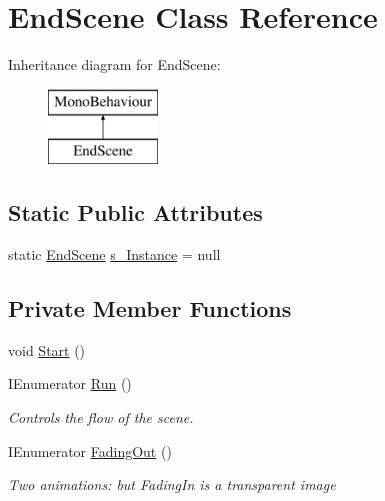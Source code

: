 \hypertarget{class_end_scene}{}\section{End\+Scene Class Reference}
\label{class_end_scene}
Inheritance diagram for End\+Scene\+:\begin{figure}[H]
\begin{center}
\leavevmode
\includegraphics[height=2.000000cm]{class_end_scene}
\end{center}
\end{figure}
\subsection*{Static Public Attributes}
\begin{DoxyCompactItemize}
\item 
static \mbox{\hyperlink{class_end_scene}{End\+Scene}} \mbox{\hyperlink{class_end_scene_a6cf08b038600652991ae00a9cf2a949b}{s\+\_\+\+Instance}} = null
\end{DoxyCompactItemize}
\subsection*{Private Member Functions}
\begin{DoxyCompactItemize}
\item 
void \mbox{\hyperlink{class_end_scene_af546101a56df683a50f88f6809d4638a}{Start}} ()
\item 
I\+Enumerator \mbox{\hyperlink{class_end_scene_aad3f8f074f1937a0615f21e95b74f33c}{Run}} ()
\begin{DoxyCompactList}\small\item\em Controls the flow of the scene. \end{DoxyCompactList}\item 
I\+Enumerator \mbox{\hyperlink{class_end_scene_aee3c069e59445bbd2c6cfa69f498fead}{Fading\+Out}} ()
\begin{DoxyCompactList}\small\item\em Two animations\+: but Fading\+In is a transparent image \end{DoxyCompactList}\end{DoxyCompactItemize}
